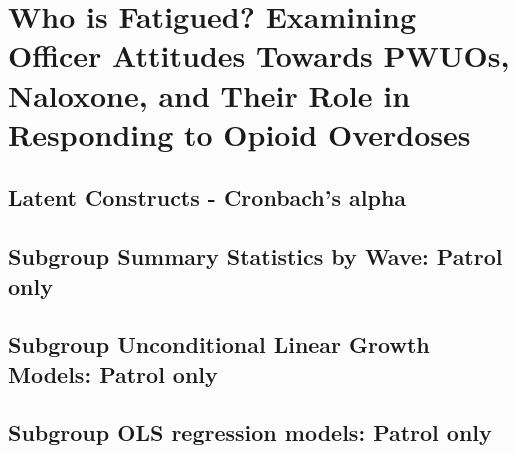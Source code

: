 \chapter{Who is Fatigued? Examining Officer Attitudes Towards PWUOs, Naloxone, and Their Role in Responding to Opioid Overdoses}
\section{Latent Constructs - Cronbach's alpha} %

\section{Subgroup Summary Statistics by Wave: Patrol only}
\begin{landscape}

\end{landscape}

\section{Subgroup Unconditional Linear Growth Models: Patrol only} %

\section{Subgroup OLS regression models: Patrol only}
\begin{landscape}

\end{landscape}